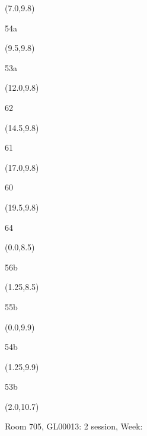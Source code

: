 \documentclass[a4paper]{article}
\newcommand{\myseat}[5]{%
\vspace{-0.1cm} \hspace{-0.5cm}
\parbox[t][2.2cm][t]{3.5cm}{%
\small #1 %
\begin{description}
\vspace{-0.1cm}
\item [ID:] #2
\vspace{-0.1cm}
\item [Team:] #3 \normalsize
\vspace{-0.1cm}
\item \normalsize #4 #5
\vspace{-0.1cm}
\end{description}
}
}
\begin{document}
\begin{CJK}{UTF8}{cyberbit}
\begin{textblock}{2.5}(7.0,9.8)
\textblockcolor{}
\myseat{54a}{}{}{}{}
\end{textblock}

\begin{textblock}{2.5}(9.5,9.8)
\textblockcolor{}
\myseat{53a}{}{}{}{}
\end{textblock}

\begin{textblock}{2.5}(12.0,9.8)
\textblockcolor{}
\myseat{62}{}{}{}{}
\end{textblock}

\begin{textblock}{2.5}(14.5,9.8)
\textblockcolor{}
\myseat{61}{}{}{}{}
\end{textblock}

\begin{textblock}{2.5}(17.0,9.8)
\textblockcolor{}
\myseat{60}{}{}{}{}
\end{textblock}

\begin{textblock}{2.5}(19.5,9.8)
\textblockcolor{}
\myseat{64}{}{}{}{}
\end{textblock}


\begin{textblock}{1.25}(0.0,8.5)
\textblockcolor{}
\myseat{56b}{}{}{}{}
\end{textblock}

\begin{textblock}{1.25}(1.25,8.5)
\textblockcolor{}
\myseat{55b}{}{}{}{}
\end{textblock}

\begin{textblock}{1.25}(0.0,9.9)
\textblockcolor{}
\myseat{54b}{}{}{}{}
\end{textblock}

\begin{textblock}{1.25}(1.25,9.9)
\textblockcolor{}
\myseat{53b}{}{}{}{}
\end{textblock}


\begin{textblock}{10}(2.0,10.7)
\textblockcolor{}
\parbox[t][2.2cm][t]{9.5cm}{%
\large Room 705, GL00013: 2 session, Week: 
\vspace{-0.3cm} \hspace{-0.5cm}
}
\end{textblock}

\end{CJK}
\end{document}
